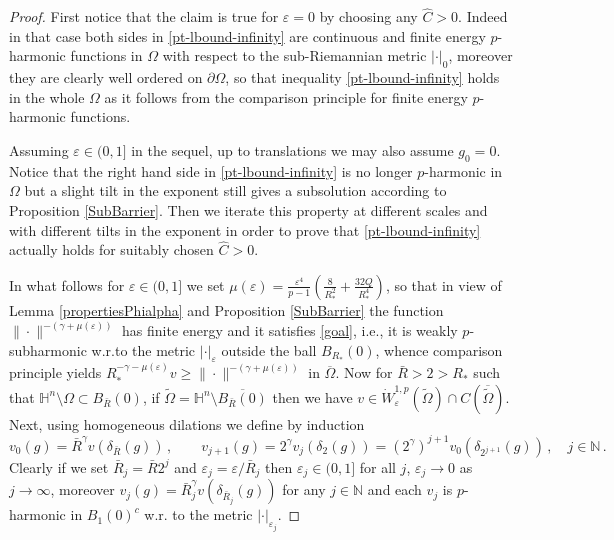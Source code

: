 \documentclass[10pt]{amsart}
\numberwithin{equation}{section}
\theoremstyle{definition}
\newcommand{\He}{\mathbb{H}}
\begin{document}
\begin{proof}
First notice that the claim is true for $\varepsilon=0$ by choosing any $\widehat{C}>0$. Indeed in that case both sides in \eqref{pt-lbound-infinity} are continuous and finite energy $p$-harmonic functions in $\Omega$ with respect to the sub-Riemannian metric $|\cdot|_0$, moreover they are clearly well ordered on $\partial \Omega$, so that inequality \eqref{pt-lbound-infinity} holds in the whole $\Omega$ as it follows from the comparison principle for finite energy $p$-harmonic functions. 

Assuming $\varepsilon \in (0,1]$ in the sequel,  up to translations we may also assume $g_0=0$. Notice that the right hand side in \eqref{pt-lbound-infinity} is no longer $p$-harmonic in $\Omega$ but a slight tilt in the exponent still gives a subsolution according to Proposition \ref{SubBarrier}. Then we iterate this property at different scales and with different tilts in the exponent in order to prove that \eqref{pt-lbound-infinity} actually holds for suitably chosen $\widehat{C}>0$.

In what follows for $\varepsilon \in(0,1]$ we set $\mu(\varepsilon)=\frac{\varepsilon^4}{p-1} \left( \frac{8}{R_\ast^2}+ \frac{32Q}{R_\ast^4}\right)$, so that in view of Lemma \ref{propertiesPhialpha} and Proposition \ref{SubBarrier} the function  $\| \cdot \|^{-(\gamma+\mu(\varepsilon))}$ has finite energy and it satisfies \eqref{goal}, i.e., it is weakly $p$-subharmonic w.r.to the metric $|\cdot|_\varepsilon$ outside the ball $B_{R_\ast}(0)$, whence comparison principle yields $ R_\ast^{-\gamma-\mu(\varepsilon)} v \geq \| \cdot \|^{-(\gamma+\mu(\varepsilon))}$ in $\overline{\Omega}$.  Now for $\bar{R}> 2> R_\ast$ such that $\He^n \setminus \Omega \subset B_{\bar{R}}(0)$, if $\widetilde{\Omega}=\He^n \setminus \overline{B_{\bar{R}}(0)}$ then we have $v \in \dot{W}^{1,p}_{\varepsilon} (\widetilde{\Omega}) \cap C(\overline{\widetilde{\Omega}})$. Next, using homogeneous dilations we define by induction
\[ v_0(g)=\bar{R}^\gamma v(\delta_{\bar{R}} (g)) \, , \qquad v_{j+1}(g)=2^\gamma v_j(\delta_2(g)) =\left(2^\gamma \right)^{j+1} v_0 (\delta_{2^{j+1}} (g)) \, ,\quad j\in \mathbb{N} \, . \]
Clearly if we set $\bar{R}_j=\bar{R} 2^j$ and $\varepsilon_j= \varepsilon/\bar{R}_j$ then $\varepsilon_j \in (0,1]$ for all $j$, $\varepsilon_j \to 0$ as $j \to \infty$, moreover $v_j(g)=\bar{R}^\gamma_j v (\delta_{\bar{R}_j}(g))$ for any $j \in \mathbb{N}$ and each $v_j$ is $p$-harmonic in $B_1(0)^c$ w.r. to the metric $|\cdot|_{\varepsilon_j}$.


\end{proof}
\end{document}
